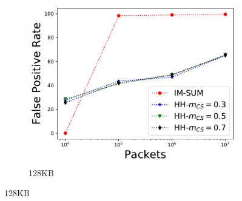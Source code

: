 \begin{figure}
\begin{subfigure}[t]{0.32\textwidth}
    \includegraphics[width=\linewidth]{HH/figures/FPR_per_pkts_m=0.125.pdf}
    \caption{128KB}
    \label{fig:fig3_c}
\end{subfigure}


\end{figure}
